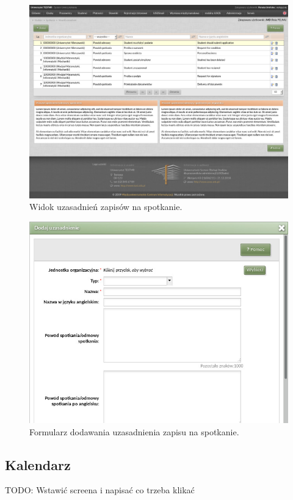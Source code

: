 \documentclass[licencjacka]{pracamgr}
\begin{document}
\begin{figure}[!]
  \includegraphics[width=\linewidth]{widok_uzasadnien.jpg}
  \caption{Widok uzasadnień zapisów na spotkanie.}
  \label{fig:uzasadnienia}
\end{figure}

\begin{figure}[!]
  \includegraphics[width=\linewidth]{formularz_uzasadnien.jpg}
  \caption{Formularz dodawania uzasadnienia zapisu na spotkanie.}
  \label{fig:formularz_uzasadnienia}
\end{figure}

\subsection{Kalendarz}
TODO: Wstawić screena i napisać co trzeba klikać
\end{document}
